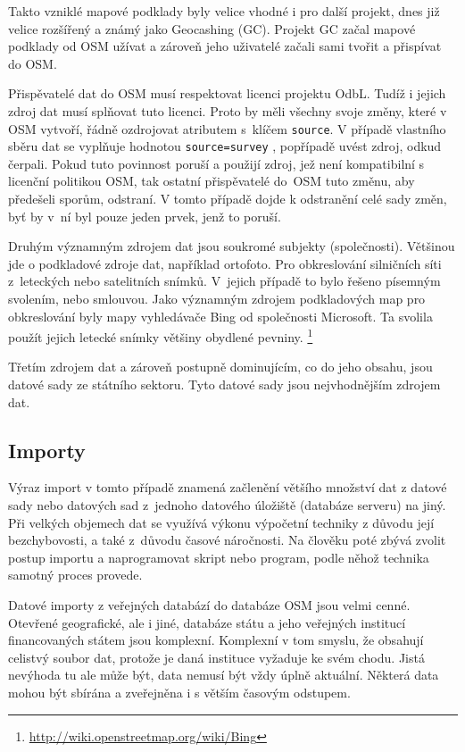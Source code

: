 Takto vzniklé mapové podklady byly velice vhodné i pro další projekt, dnes již
velice rozšířený a známý jako Geocashing (GC). Projekt GC začal mapové
podklady od OSM užívat a zároveň jeho uživatelé začali sami tvořit a
přispívat do OSM. 

Přispěvatelé dat do OSM musí respektovat licenci projektu OdbL.
Tudíž i jejich zdroj dat musí splňovat tuto licenci. Proto by měli
všechny svoje změny, které v OSM vytvoří, řádně ozdrojovat atributem
s~klíčem 
{\tt source}.
V případě vlastního sběru dat se vyplňuje hodnotou
{\tt source=survey} ,
popřípadě uvést zdroj, odkud čerpali. Pokud tuto povinnost poruší a
použijí zdroj, jež není kompatibilní s licenční politikou OSM, tak ostatní 
přispěvatelé do~OSM tuto změnu, aby předešeli sporům, odstraní. 
V tomto případě dojde k odstranění celé sady změn, byť by v~ní byl pouze jeden prvek, jenž to poruší.

Druhým významným zdrojem dat jsou soukromé subjekty (společnosti).
Většinou jde o podkladové zdroje dat, například ortofoto. Pro obkreslování
silničních síti z~leteckých nebo satelitních snímků. V~jejich případě to
bylo řešeno písemným svolením, nebo smlouvou. Jako významným zdrojem
podkladových map pro obkreslování byly mapy vyhledávače Bing od společnosti
Microsoft. Ta svolila použít jejich letecké snímky většiny
obydlené pevniny. \footnote{\url{http://wiki.openstreetmap.org/wiki/Bing}}

Třetím zdrojem dat a zároveň postupně dominujícím, co do jeho obsahu, jsou
datové sady ze státního sektoru. Tyto datové sady jsou nejvhodnějším zdrojem
dat.

\subsection{Importy}
\label{Importy}
Výraz import v tomto případě znamená začlenění většího množství dat z datové sady nebo datových sad
z~jednoho datového úložiště (databáze serveru) na jiný. Při velkých objemech dat
se využívá výkonu výpočetní techniky z důvodu její bezchybovosti, a také
z~důvodu časové náročnosti. Na člověku poté zbývá zvolit postup importu
a naprogramovat skript nebo program, podle něhož technika samotný proces
provede. 

Datové importy z veřejných databází do databáze OSM jsou velmi cenné. 
Otevřené geografické, ale i jiné, databáze státu a jeho veřejných institucí 
financovaných státem jsou komplexní. Komplexní v tom smyslu, že obsahují celistvý
soubor dat, protože je daná instituce vyžaduje ke svém chodu. Jistá nevýhoda tu 
ale může být, data nemusí být vždy úplně aktuální. Některá data mohou 
být sbírána a zveřejněna i s větším časovým odstupem.

